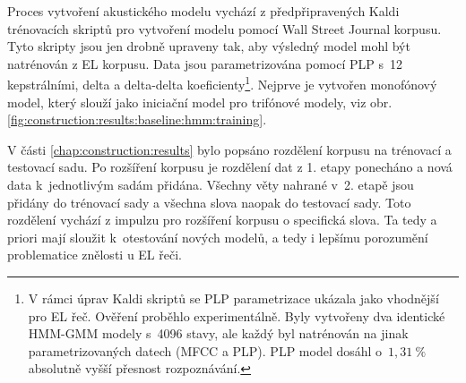 
Proces vytvoření akustického modelu vychází z předpřipravených Kaldi trénovacích skriptů pro vytvoření modelu pomocí Wall Street Journal korpusu.
Tyto skripty jsou jen drobně upraveny tak, aby výsledný model mohl být natrénován z EL korpusu. Data jsou parametrizována pomocí PLP s~12 kepstrálními, delta a delta-delta koeficienty\footnote{V rámci úprav Kaldi skriptů se PLP parametrizace ukázala jako vhodnější pro EL řeč. Ověření proběhlo experimentálně. Byly vytvořeny dva identické HMM-GMM modely s~4096 stavy, ale každý byl natrénován na jinak parametrizovaných datech (MFCC a PLP). PLP model dosáhl o~$1,31\ \%$ absolutně vyšší přesnost rozpoznávání.}. Nejprve je vytvořen monofónový model, který slouží jako iniciační model pro trifónové  modely, viz obr. \ref{fig:construction:results:baseline:hmm:training}.


V části \ref{chap:construction:results} bylo popsáno rozdělení korpusu na trénovací a testovací sadu.
Po rozšíření korpusu je rozdělení dat z 1. etapy ponecháno a nová data  k~jednotlivým sadám přidána.
Všechny věty nahrané v~2. etapě jsou přidány do trénovací sady a všechna slova naopak do testovací sady.
Toto rozdělení vychází z impulzu pro rozšíření korpusu o specifická slova.
Ta tedy a priori mají sloužit  k~otestování nových modelů, a tedy i lepšímu porozumění problematice znělosti u EL řeči.


